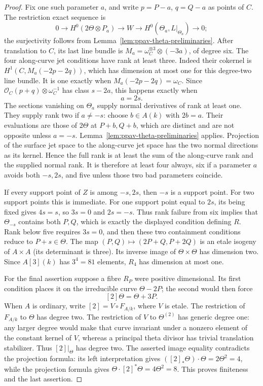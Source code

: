 \begin{proof}
Fix one such parameter $a$, and write $p=P-a$, $q=Q-a$ as points
of $C$. The restriction exact sequence is
\[
 0\longrightarrow H^0(2\Theta\otimes P_a)
 \longrightarrow W\longrightarrow H^0(\Theta_a,L|_{\Theta_a})
 \longrightarrow0;
\]
the surjectivity follows from Lemma~\ref{lem:ppav-theta-preliminaries}.
After translation to $C$, its last line bundle is
$M_a=\omega_C^{\otimes3}\otimes(-3a)$, of degree six.
The four along-curve jet conditions have rank at least three.
Indeed their cokernel is $H^1(C,M_a(-2p-2q))$, which has dimension
at most one for this degree-two line bundle. It is one exactly
when $M_a(-2p-2q)=\omega_C$. Since
$\mathcal O_C(p+q)\otimes\omega_C^{-1}$ has class $s-2a$,
this happens exactly when
\[
                              a=2s.
\]
The sections vanishing on $\Theta_a$ supply normal derivatives of
rank at least one. They supply rank two if $a\ne -s$: choose
$b\in A(k)$ with $2b=a$. Their evaluations are those of
$2\Theta$ at $P+b,Q+b$, which are distinct and are not opposite
unless $a=-s$. Lemma~\ref{lem:ppav-theta-preliminaries} applies.
Projection of the surface jet space to the along-curve jet space
has the two normal directions as its kernel. Hence the full rank
is at least the sum of the along-curve rank and the supplied normal
rank. It is therefore at least four always, six if a parameter
$a$ avoids both $-s,2s$, and five unless those two bad parameters
coincide.

If every support point of $Z$ is among $-s,2s$, then $-s$ is a
support point. For two support points this is immediate. For one
support point equal to $2s$, its being fixed gives $4s=s$, so
$3s=0$ and $2s=-s$. Thus rank failure from six implies that
$\Theta_{-s}$ contains both $P,Q$, which is exactly the displayed
condition defining $R$. Rank below five requires $3s=0$, and then
these two containment conditions reduce to $P+s\in\Theta$.
The map $(P,Q)\mapsto(2P+Q,P+2Q)$ is an etale isogeny of
$A\times A$ (its determinant is three). Its inverse image of
$\Theta\times\Theta$ has dimension two. Since $A[3](k)$ has
$3^4=81$ elements, $R_4$ has dimension at most one.

For the final assertion suppose a fibre $R_P$ were positive
dimensional. Its first condition places it on the irreducible curve
$\Theta-2P$; the second would then force
\[
                           [2]\Theta=\Theta+3P.
\]
When $A$ is ordinary, write $[2]=V\circ F_{A/k}$, where $V$ is
etale. The restriction of $F_{A/k}$ to $\Theta$ has degree two.
The restriction of $V$ to $\Theta^{(2)}$ has generic degree one:
any larger degree would make that curve invariant under a nonzero
element of the constant kernel of $V$, whereas a principal theta
divisor has trivial translation stabilizer. Thus $[2]|_\Theta$
has degree two. The asserted image equality contradicts the
projection formula: its left interpretation gives
$([2]_*\Theta)\cdot\Theta=2\Theta^2=4$, while the projection
formula gives $\Theta\cdot[2]^*\Theta=4\Theta^2=8$.
This proves finiteness and the last assertion.
\end{proof}

